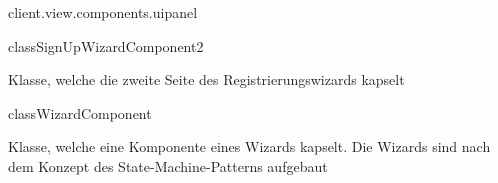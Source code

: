 \begin{texdocpackage}{client.view.components.uipanel}
\begin{texdocclass}{class}{SignUpWizardComponent2}
\label{texdoclet:edu.kit.informatik.studyplan.client.view.components.uipanel.SignUpWizardComponent2}
\begin{texdocclassintro}
Klasse, welche die zweite Seite des Registrierungswizards kapselt\end{texdocclassintro}
\begin{texdocclassconstructors}
\end{texdocclassconstructors}
\begin{texdocclassmethods}
\end{texdocclassmethods}
\end{texdocclass}


\begin{texdocclass}{class}{WizardComponent}
\label{texdoclet:edu.kit.informatik.studyplan.client.view.components.uipanel.WizardComponent}
\begin{texdocclassintro}
Klasse, welche eine Komponente eines Wizards kapselt. Die Wizards sind nach
 dem Konzept des State-Machine-Patterns aufgebaut\end{texdocclassintro}
\begin{texdocclassconstructors}
\end{texdocclassconstructors}
\begin{texdocclassmethods}
\end{texdocclassmethods}
\end{texdocclass}


\end{texdocpackage}



